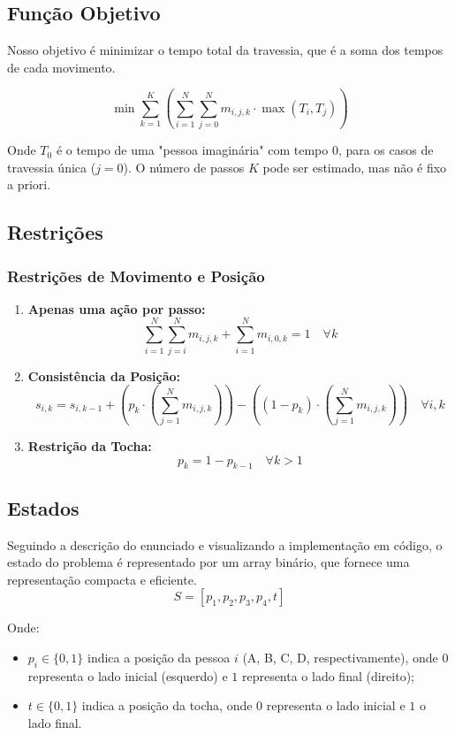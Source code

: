\documentclass[12pt,a4paper]{article}
\begin{document}
\subsection{Função Objetivo}
Nosso objetivo é minimizar o tempo total da travessia, que é a soma dos tempos de cada movimento.

\[
\min \sum_{k=1}^{K} \left( \sum_{i=1}^{N} \sum_{j=0}^{N} m_{i,j,k} \cdot \max(T_i, T_j) \right)
\]

Onde $T_0$ é o tempo de uma "pessoa imaginária" com tempo 0, para os casos de travessia única ($j=0$).
O número de passos $K$ pode ser estimado, mas não é fixo a priori.

\subsection{Restrições}
\subsubsection{Restrições de Movimento e Posição}
\begin{enumerate}
    \item \textbf{Apenas uma ação por passo:}
    \[
    \sum_{i=1}^{N} \sum_{j=i}^{N} m_{i,j,k} + \sum_{i=1}^{N} m_{i,0,k} = 1 \quad \forall k
    \]
    \item \textbf{Consistência da Posição:}
    \[
    s_{i,k} = s_{i,k-1} + (p_k \cdot (\sum_{j=1}^{N} m_{i,j,k})) - ((1-p_k) \cdot (\sum_{j=1}^{N} m_{i,j,k})) \quad \forall i,k
    \]
    \item \textbf{Restrição da Tocha:}
    \[
    p_k = 1 - p_{k-1} \quad \forall k > 1
    \]
\end{enumerate}

\subsection{Estados}
Seguindo a descrição do enunciado e visualizando a implementação em código, o estado do problema é representado por um array binário, que fornece uma representação compacta e eficiente.
\[
S = [p_1, p_2, p_3, p_4, t]
\]

Onde:
\begin{itemize}
    \item $p_i \in \{0, 1\}$ indica a posição da pessoa $i$ (A, B, C, D, respectivamente), onde $0$ representa o lado inicial (esquerdo) e $1$ representa o lado final (direito);
    \item $t \in \{0, 1\}$ indica a posição da tocha, onde $0$ representa o lado inicial e $1$ o lado final.
\end{itemize}
\end{document}

